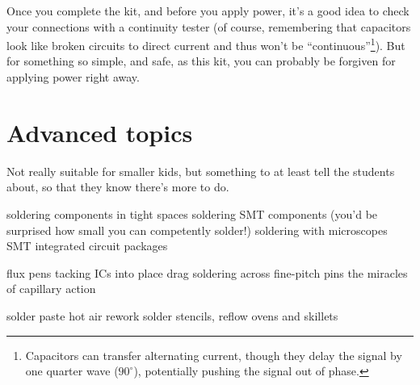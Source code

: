 \documentclass[12pt]{article}
\begin{document}
Once you complete the kit, and before you apply power, it's a good idea to check your connections with a continuity tester (of course, remembering that capacitors look like broken circuits to direct current and thus won't be ``continuous''\footnote{Capacitors can transfer alternating current, though they delay the signal by one quarter wave ($90^{\circ}$), potentially pushing the signal out of phase.}). But for something so simple, and safe, as this kit, you can probably be forgiven for applying power right away.

\section{Advanced topics}

Not really suitable for smaller kids, but something to at least tell the students about, so that they know there's more to do.

\begin{enumerate}
\+ soldering components in tight spaces
\+ soldering SMT components (you'd be surprised how small you can competently solder!)
\+ soldering with microscopes
\+ SMT integrated circuit packages
	\begin{itemize}
	\+ flux pens
	\+ tacking ICs into place
	\+ drag soldering across fine-pitch pins
	\+ the miracles of capillary action
	\end{itemize}
\+ solder paste
\+ hot air rework
\+ solder stencils, reflow ovens and skillets
\end{enumerate}
\end{document}
